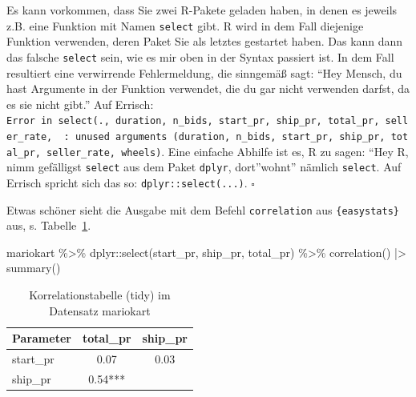 \documentclass[
  letterpaper,
]{scrbook}
\newenvironment{Shaded}{\begin{snugshade}}{\end{snugshade}}
\newcommand{\FunctionTok}[1]{\textcolor[rgb]{0.28,0.35,0.67}{#1}}
\newcommand{\NormalTok}[1]{\textcolor[rgb]{0.00,0.23,0.31}{#1}}
\newcommand{\SpecialCharTok}[1]{\textcolor[rgb]{0.37,0.37,0.37}{#1}}
\theoremstyle{definition}
\theoremstyle{definition}
\theoremstyle{definition}
\theoremstyle{remark}
\begin{document}
\begin{tcolorbox}[enhanced jigsaw, colbacktitle=quarto-callout-caution-color!10!white, toptitle=1mm, colframe=quarto-callout-caution-color-frame, breakable, toprule=.15mm, bottomrule=.15mm, bottomtitle=1mm, left=2mm, opacitybacktitle=0.6, colback=white, arc=.35mm, coltitle=black, title=\textcolor{quarto-callout-caution-color}{\faFire}\hspace{0.5em}{Namensverwechslung (name clash)}, opacityback=0, rightrule=.15mm, leftrule=.75mm, titlerule=0mm]

Es kann vorkommen, dass Sie zwei R-Pakete geladen haben, in denen es
jeweils z.B. eine Funktion mit Namen \texttt{select} gibt. R wird in dem
Fall diejenige Funktion verwenden, deren Paket Sie als letztes gestartet
haben. Das kann dann das falsche \texttt{select} sein, wie es mir oben
in der Syntax passiert ist. In dem Fall resultiert eine verwirrende
Fehlermeldung, die sinngemäß sagt: \enquote{Hey Mensch, du hast
Argumente in der Funktion verwendet, die du gar nicht verwenden darfst,
da es sie nicht gibt.} Auf Errisch:
\texttt{Error\ in\ select(.,\ duration,\ n\_bids,\ start\_pr,\ ship\_pr,\ total\_pr,\ seller\_rate,\ \ :\ unused\ arguments\ (duration,\ n\_bids,\ start\_pr,\ ship\_pr,\ total\_pr,\ seller\_rate,\ wheels)}.
Eine einfache Abhilfe ist es, R zu sagen: \enquote{Hey R, nimm
gefälligst \texttt{select} aus dem Paket \texttt{dplyr}, dort}wohnt''
nämlich \texttt{select}. Auf Errisch spricht sich das so:
\texttt{dplyr::select(...)}. \(\square\)

\end{tcolorbox}

Etwas schöner sieht die Ausgabe mit dem Befehl \texttt{correlation} aus
\texttt{\{easystats\}} aus, s. Tabelle~\ref{tbl-mario-corr-pdf}.

\begin{Shaded}
\begin{Highlighting}[]
\NormalTok{mariokart }\SpecialCharTok{\%\textgreater{}\%} 
\NormalTok{  dplyr}\SpecialCharTok{::}\FunctionTok{select}\NormalTok{(start\_pr, ship\_pr, total\_pr) }\SpecialCharTok{\%\textgreater{}\%} 
  \FunctionTok{correlation}\NormalTok{() }\SpecialCharTok{|\textgreater{}} 
  \FunctionTok{summary}\NormalTok{() }
\end{Highlighting}
\end{Shaded}

\begin{longtable}[]{@{}lcc@{}}

\caption{\label{tbl-mario-corr-pdf}Korrelationstabelle (tidy) im
Datensatz mariokart}

\tabularnewline

\toprule\noalign{}
Parameter & total\_pr & ship\_pr \\
\midrule\noalign{}
\endhead
\bottomrule\noalign{}
\endlastfoot
start\_pr & 0.07 & 0.03 \\
ship\_pr & 0.54*** & \\

\end{longtable}
\end{document}
